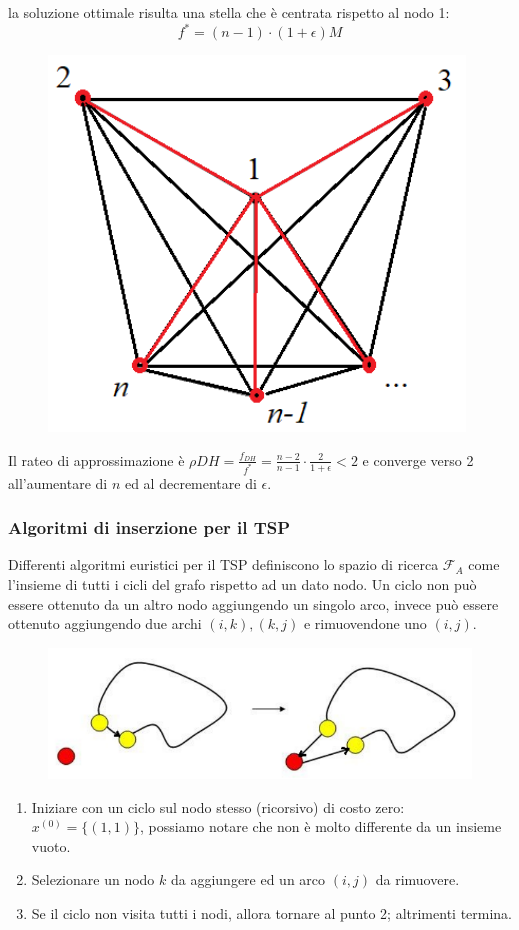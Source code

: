 \documentclass{article}
\begin{document}
    la soluzione ottimale risulta una stella che è centrata rispetto al nodo 1:
    $$f^* = (n-1)\cdot(1+\epsilon)M$$
    \begin{figure}[H]
        \centering
        \includegraphics[scale=0.5]{images/star1.png}
    \end{figure}
    Il rateo di approssimazione è $\rho DH=\frac{f_{DH}}{f^*}=\frac{n-2}{n-1}\cdot\frac{2}{1+\epsilon}<2$ e converge
    verso 2 all'aumentare di $n$ ed al decrementare di $\epsilon$.

    \subsubsection{Algoritmi di inserzione per il TSP}
    Differenti algoritmi euristici per il TSP definiscono lo spazio di ricerca $\mathcal{F}_A$ come
    l'insieme di tutti i cicli del grafo rispetto ad un dato nodo. Un ciclo non può essere ottenuto
    da un altro nodo aggiungendo un singolo arco, invece può essere ottenuto aggiungendo due archi
$(i,k),(k,j)$ e rimuovendone uno $(i,j)$.

    \begin{figure}[H]
        \centering
        \includegraphics[scale=0.5]{images/looop.png}
    \end{figure}
    \begin{enumerate}
        \item Iniziare con un ciclo sul nodo stesso (ricorsivo) di costo zero: $x^{(0)}=\{(1,1)\}$,
              possiamo notare che non è molto differente da un insieme vuoto.
        \item Selezionare un nodo $k$ da aggiungere ed un arco $(i,j)$ da rimuovere.
        \item Se il ciclo non visita tutti i nodi, allora tornare al punto 2; altrimenti termina.
    \end{enumerate}
\end{document}
